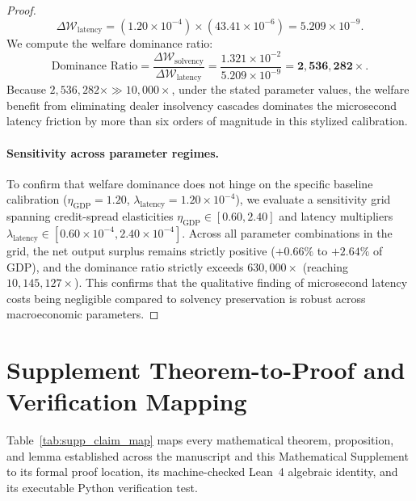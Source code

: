 \documentclass[11pt,a4paper]{article}
\theoremstyle{definition}\newtheorem{definition}[theorem]{Definition}
\theoremstyle{remark}\newtheorem{remark}[theorem]{Remark}
\begin{document}
\begin{proof}
\begin{equation}
\Delta \mathcal{W}_{\text{latency}} = (1.20 \times 10^{-4}) \times (43.41 \times 10^{-6}) = 5.209 \times 10^{-9}.
\end{equation}
We compute the welfare dominance ratio:
\begin{equation}
\text{Dominance Ratio} = \frac{\Delta \mathcal{W}_{\text{solvency}}}{\Delta \mathcal{W}_{\text{latency}}} = \frac{1.321 \times 10^{-2}}{5.209 \times 10^{-9}} = \mathbf{2,536,282\times}.
\end{equation}
Because $2,536,282\times \gg 10{,}000\times$, under the stated parameter values, the welfare benefit from eliminating dealer insolvency cascades dominates the microsecond latency friction by more than six orders of magnitude in this stylized calibration.

\paragraph{Sensitivity across parameter regimes.}
To confirm that welfare dominance does not hinge on the specific baseline calibration ($\eta_{\text{GDP}} = 1.20$, $\lambda_{\text{latency}} = 1.20 \times 10^{-4}$), we evaluate a sensitivity grid spanning credit-spread elasticities $\eta_{\text{GDP}} \in [0.60, 2.40]$ and latency multipliers $\lambda_{\text{latency}} \in [0.60 \times 10^{-4}, 2.40 \times 10^{-4}]$. Across all parameter combinations in the grid, the net output surplus remains strictly positive ($+0.66\%$ to $+2.64\%$ of GDP), and the dominance ratio strictly exceeds $630{,}000\times$ (reaching $10{,}145{,}127\times$). This confirms that the qualitative finding of microsecond latency costs being negligible compared to solvency preservation is robust across macroeconomic parameters.
\end{proof}

\section{Supplement Theorem-to-Proof and Verification Mapping}
\label{sec:supp_proof_map}
Table~\ref{tab:supp_claim_map} maps every mathematical theorem, proposition, and lemma established across the manuscript and this Mathematical Supplement to its formal proof location, its machine-checked Lean~4 algebraic identity, and its executable Python verification test.
\end{document}
